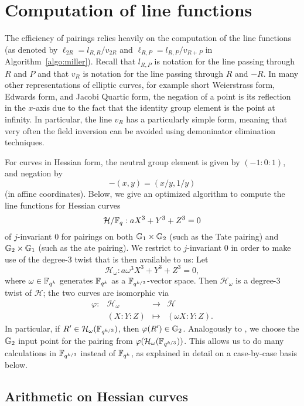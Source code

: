 \section{Computation of line functions}
\label{sec:lines}

The efficiency of pairings relies heavily on the computation of the line functions
(as denoted by $\ell_{2R} = l_{R,R}/v_{2R}$ and $\ell_{R,P} = l_{R,P}/v_{R+P}$ in Algorithm~\ref{algo:miller}).
Recall that $l_{R,P}$ is notation for the line passing through $R$ and $P$ and that
$v_{R}$ is notation for the line passing through $R$ and $-R$.
In many other representations of elliptic curves, for example short Weierstrass form,
Edwards form, and Jacobi Quartic form, the negation of a point is its reflection in the $x$-axis
due to the fact that the identity group element is the point at infinity.
In particular, the line $v_R$ has a particularly simple form, meaning that very often
the field inversion can be avoided using demoninator elimination techniques.

For curves in Hessian form, the neutral group element is given by $(-1:0:1)$,
and negation by
\[-(x,y) = (x/y,1/y)\]
(in affine coordinates).
Below, we give an optimized algorithm to compute the line functions for
Hessian curves 
\[\mathcal{H}/\mathbb{F}_{q}: aX^3 + Y^3 + Z^3 = 0\]
of $j$-invariant 0 
for pairings on both $\mathbb{G}_{1} \times \mathbb{G}_{2}$ (such as the Tate pairing)
and $\mathbb{G}_{2} \times \mathbb{G}_{1}$ (such as the ate pairing).
We restrict to $j$-invariant 0 in order to make use of the degree-3 twist that
is then available to us:
Let
$$ \mathcal{H}_{\omega}: a \omega^3 X^3 + Y^3 + Z^3 = 0, $$
where $\omega \in \mathbb{F}_{q^k} $ generates $\mathbb{F}_{q^k}$ as a $\mathbb{F}_{q^{k/3}}$-vector space.
Then $\mathcal{H}_{\omega}$ is a degree-3 twist of $\mathcal{H}$; the two curves are isomorphic via
\begin{equation}\label{twistiso}
\begin{array}{rccc}
\varphi: & \mathcal{H}_{\omega} & \rightarrow & \mathcal{H} \\
& (X:Y:Z) & \mapsto & (\omega X:Y:Z).
\end{array}
\end{equation}
In particular, if $R' \in \mathcal{H}_{\omega}(\mathbb{F}_{q^{k/3}})$, then
$\varphi(R') \in \mathbb{G}_{2}$.
Analogously to \cite{??}, we choose the $\mathbb{G}_{2}$ input point for the pairing
from $\varphi(\mathcal{H}_{\omega}(\mathbb{F}_{q^{k/3}}))$.
This allows us to do many calculations in $\mathbb{F}_{q^{k/3}}$ instead of $\mathbb{F}_{q^k}$,
as explained in detail on a case-by-case basis below.

\subsection{Arithmetic on Hessian curves}

